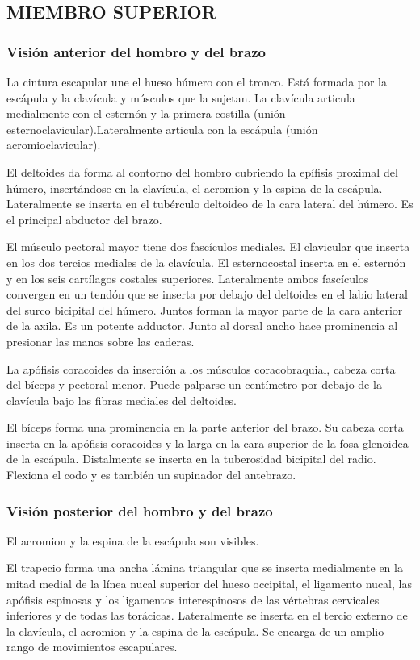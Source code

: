 \documentclass[a4paper,12pt]{article} %
\begin{document}
\begin{appendices}
\subsection{MIEMBRO SUPERIOR}

\subsubsection{Visión anterior del hombro y del brazo}
La cintura escapular une el hueso húmero con el tronco. Está formada por la escápula y la clavícula y músculos que la sujetan. La clavícula articula medialmente con el esternón y la primera costilla (unión esternoclavicular).Lateralmente articula con la escápula (unión acromioclavicular).

El deltoides da forma al contorno del hombro cubriendo la epífisis proximal del húmero, insertándose en la clavícula, el acromion y la espina de la escápula. Lateralmente se inserta en el tubérculo deltoideo de la cara lateral del húmero. Es el principal abductor del brazo.

El músculo pectoral mayor tiene dos fascículos mediales. El clavicular que inserta en los dos tercios mediales de la clavícula. El esternocostal inserta en el esternón y en los seis cartílagos costales superiores. Lateralmente ambos fascículos convergen en un tendón  que se inserta por debajo del deltoides en el labio lateral del surco bicipital del húmero. Juntos forman la mayor parte de la cara anterior de la axila. Es un potente adductor. Junto al dorsal ancho hace prominencia al presionar las manos sobre las caderas.

La apófisis coracoides da inserción a los músculos coracobraquial, cabeza corta del bíceps y pectoral menor. Puede palparse un centímetro por debajo de la clavícula bajo las fibras mediales del deltoides.

El bíceps forma una prominencia en la parte anterior del brazo. Su cabeza corta inserta en la apófisis coracoides y la larga en la cara superior de la fosa glenoidea de la escápula. Distalmente se inserta en la tuberosidad bicipital del radio. Flexiona el codo y es también un supinador del antebrazo.

\subsubsection{Visión posterior del hombro y del brazo}
El acromion y la espina de la escápula son visibles.

El trapecio forma una ancha lámina triangular que se inserta medialmente en la mitad medial de la línea nucal superior del hueso occipital, el ligamento nucal, las apófisis espinosas y los ligamentos interespinosos de las vértebras cervicales inferiores y de todas las torácicas. Lateralmente se inserta en el tercio externo de la clavícula, el acromion y la espina de la escápula. Se encarga de un amplio rango de movimientos escapulares.


\end{appendices}
\end{document}
